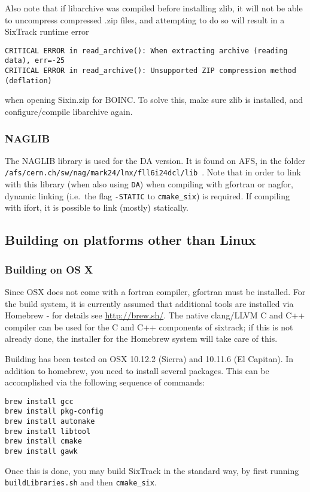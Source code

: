 \documentclass[english,BCOR=0mm,DIV=18]{scrartcl}
\begin{document}
Also note that if libarchive was compiled before installing zlib, it will not be able to uncompress compressed .zip files, and attempting to do so will result in a SixTrack runtime error
\begin{verbatim}
CRITICAL ERROR in read_archive(): When extracting archive (reading data), err=-25
CRITICAL ERROR in read_archive(): Unsupported ZIP compression method (deflation)
\end{verbatim}
when opening Sixin.zip for BOINC.
To solve this, make sure zlib is installed, and configure/compile libarchive again.

\subsubsection{NAGLIB}
\label{sec:building:libs:naglib}
The NAGLIB library  is used for the DA version.
It is found on AFS, in the folder \texttt{/afs/cern.ch/sw/nag/mark24/lnx/fll6i24dcl/lib}~.
Note that in order to link with this library (when also using \texttt{DA}) when compiling with gfortran or nagfor, dynamic linking (i.e.\ the flag \texttt{-STATIC} to \texttt{cmake\_six}) is required.
If compiling with ifort, it is possible to link (mostly) statically.

\subsection{Building on platforms other than Linux}

\subsubsection{Building on OS X}

Since OSX does not come with a fortran compiler, gfortran must be installed.
For the build system, it is currently assumed that additional tools are installed via Homebrew - for details see \url{http://brew.sh/}.
The native clang/LLVM C and C++ compiler can be used for the C and C++ components of sixtrack; if this is not already done, the installer for the Homebrew system will take care of this.

Building has been tested on OSX 10.12.2 (Sierra) and 10.11.6 (El Capitan).
In addition to homebrew, you need to install several packages.
This can be accomplished via the following sequence of commands:
\begin{lstlisting}
brew install gcc
brew install pkg-config
brew install automake
brew install libtool
brew install cmake
brew install gawk
\end{lstlisting}
Once this is done, you may build SixTrack in the standard way, by first running \texttt{buildLibraries.sh} and then \texttt{cmake\_six}.
\end{document}
